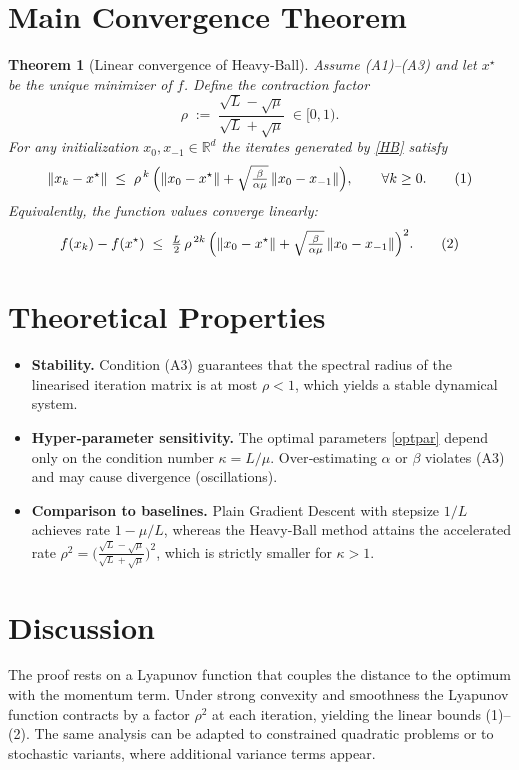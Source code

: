 \documentclass{article}
\newtheorem{theorem}{Theorem}
\begin{document}
\section*{Main Convergence Theorem}
\begin{theorem}[Linear convergence of Heavy‑Ball]\label{thm:HB}
Assume (A1)–(A3) and let $x^{\star}$ be the unique minimizer of $f$.
Define the contraction factor
\[
\rho\;:=\;\frac{\sqrt{L}-\sqrt{\mu}}{\sqrt{L}+\sqrt{\mu}}\;\in[0,1).
\]
For any initialization $x_{0},x_{-1}\in\mathbb{R}^{d}$ the iterates generated by
\eqref{HB} satisfy
\begin{equation}
\|x_{k}-x^{\star}\|\;\le\;\rho^{\,k}\,\Bigl(\|x_{0}-x^{\star}\|+\sqrt{\tfrac{\beta}{\alpha\mu}}\,
\|x_{0}-x_{-1}\|\Bigr),\qquad\forall k\ge0.
\tag{1}
\end{equation}
Equivalently, the function values converge linearly:
\[
f(x_{k})-f(x^{\star})\;\le\;\tfrac{L}{2}\,\rho^{\,2k}\,
\Bigl(\|x_{0}-x^{\star}\|+\sqrt{\tfrac{\beta}{\alpha\mu}}\,
\|x_{0}-x_{-1}\|\Bigr)^{2}.
\tag{2}
\]
\end{theorem}

\section*{Theoretical Properties}
\begin{itemize}
\item \textbf{Stability.} Condition (A3) guarantees that the spectral radius of the
linearised iteration matrix is at most $\rho<1$, which yields a stable
dynamical system.
\item \textbf{Hyper‑parameter sensitivity.}
  The optimal parameters \eqref{optpar} depend only on the condition number
  $\kappa = L/\mu$.  Over‑estimating $\alpha$ or $\beta$ violates (A3) and may
  cause divergence (oscillations).
\item \textbf{Comparison to baselines.}
  Plain Gradient Descent with stepsize $1/L$ achieves rate $1-\mu/L$,
  whereas the Heavy‑Ball method attains the accelerated rate $\rho^{2}
  =\bigl(\frac{\sqrt{L}-\sqrt{\mu}}{\sqrt{L}+\sqrt{\mu}}\bigr)^{2}$,
  which is strictly smaller for $\kappa>1$.
\end{itemize}

\section*{Discussion}
The proof rests on a Lyapunov function that couples the distance to the optimum
with the momentum term.  Under strong convexity and smoothness the Lyapunov
function contracts by a factor $\rho^{2}$ at each iteration, yielding the
linear bounds (1)–(2).  The same analysis can be adapted to
constrained quadratic problems or to stochastic variants, where additional
variance terms appear.
\end{document}
